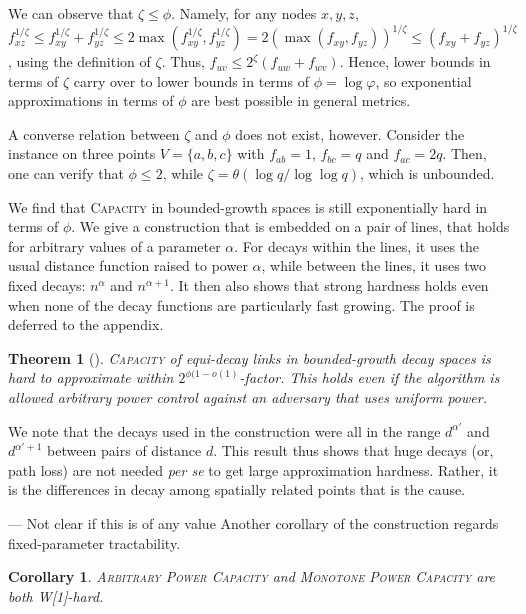 \documentclass[11pt]{amsart}
\newcounter{foo}
\newtheorem{theorem}[foo]{Theorem}
\newtheorem{corollary}[lemma]{Corollary}
\newcommand{\prob}[1]{\textsc{#1}}
\newcommand{\Capacity}{\prob{Capacity}}
\newcommand{\capacity}{\Capacity}
\begin{document}
We can observe that $\zeta \le \phi$. Namely, for any nodes $x, y, z$,
$f_{xz}^{1/\zeta} \le f_{xy}^{1/\zeta} + f_{yz}^{1/\zeta} 
  \le 2 \max(f_{xy}^{1/\zeta},f_{yz}^{1/\zeta}) 
  = 2 (\max(f_{xy},f_{yz}))^{1/\zeta} \le (f_{xy}+f_{yz})^{1/\zeta}$, 
using the definition of $\zeta$.
Thus, $f_{uv} \le 2^{\zeta}(f_{uw} +f_{wv})$.
Hence, lower bounds in terms of $\zeta$
carry over to lower bounds in terms of $\phi = \log \varphi$,
so exponential approximations in terms of $\phi$ are best
possible in general metrics.

A converse relation between $\zeta$ and $\phi$ does not exist, however.
Consider the instance on three points $V=\{a,b,c\}$ with 
$f_{ab}=1$, $f_{bc}=q$ and $f_{ac} = 2q$. 
Then, one can verify that $\phi \le 2$, while 
$\zeta = \theta(\log q/\log\log q)$, which is unbounded.


We find that {\capacity} in
bounded-growth spaces is still exponentially hard in terms of $\phi$.
We give a construction that is embedded on a pair of lines,
that holds for arbitrary values of a parameter $\alpha$.
For decays within the lines, it uses the usual distance function raised to power $\alpha$,
while between the lines, it uses two fixed decays: $n^\alpha$ and $n^{\alpha+1}$.
It then also shows that strong hardness holds even when none of the decay
functions are particularly fast growing. 
The proof is deferred to the appendix.

\begin{theorem}[\cite{GHWW09}]
\prob{Capacity} of equi-decay links in bounded-growth decay spaces
is hard to approximate within $2^{\phi(1-o(1)}$-factor.
This holds even if the algorithm is allowed 
arbitrary power control against an adversary that uses uniform power.
\label{thm:hardness}
\end{theorem}

We note that the decays used in the construction were all 
in the range $d^{\alpha'}$ and $d^{\alpha'+1}$ between pairs of distance $d$.
This result thus shows that huge decays (or, path loss) are not
needed \emph{per se} to get large approximation hardness. Rather, it is the
differences in decay among spatially related points that is the
cause. 


\iffalse --- Not clear if this is of any value
Another corollary of the construction regards fixed-parameter tractability.

\begin{corollary}
\prob{Arbitrary Power Capacity} and \prob{Monotone Power Capacity}
are both W[1]-hard.
\label{thm:w1hardness}
\end{corollary}
\end{document}
